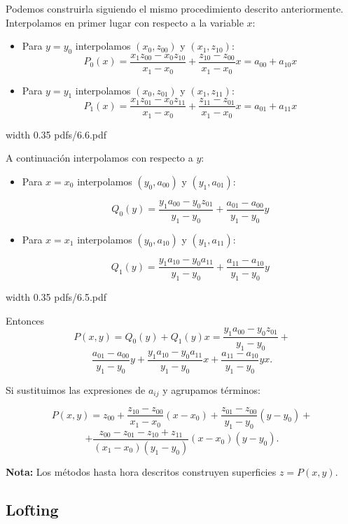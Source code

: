 \documentclass[twoside]{report}
\newcommand{\colocapdf}[2]{\quad\pdfimage width #2 {pdfs/#1.pdf}}
\begin{document}
Podemos construirla siguiendo el mismo procedimiento descrito anteriormente. Interpolamos en primer lugar con respecto a la variable $x$:
\begin{itemize}
\item Para $y=y_0$ interpolamos $(x_0,z_{00})$ y $(x_1,z_{10})$:
$$P_0(x)=\frac{x_1 z_{00}-x_0 z_{10}}{x_1-x_0}+\frac{z_{10}-z_{00}}{x_1-x_0}x=a_{00}+a_{10}x$$
\item Para $y=y_1$ interpolamos $(x_0,z_{01})$ y $(x_1,z_{11})$:
$$P_1(x)=\frac{x_1 z_{01}-x_0 z_{11}}{x_1-x_0}+\frac{z_{11}-z_{01}}{x_1-x_0}x=a_{01}+a_{11}x$$
\end{itemize}

\begin{center}
\colocapdf{6.6}{0.35\textwidth}
\end{center}

A continuaci\'{o}n interpolamos con respecto a $y$:
\begin{itemize}
\item Para $x=x_0$ interpolamos $(y_0,a_{00})$ y $(y_1,a_{01})$:

$$Q_0(y)=\frac{y_1 a_{00}-y_0 z_{01}}{y_1-y_0}+\frac{a_{01}-a_{00}}{y_1-y_0}y$$
\item Para $x=x_1$ interpolamos $(y_0,a_{10})$ y $(y_1,a_{11})$:

$$Q_1(y)=\frac{y_1 a_{10}-y_0 a_{11}}{y_1-y_0}+\frac{a_{11}-a_{10}}{y_1-y_0}y$$

\end{itemize}

\begin{center}
\colocapdf{6.5}{0.35\textwidth}
\end{center}

Entonces
$$P(x,y)=Q_0(y)+Q_1(y)x=\frac{y_1 a_{00}-y_0 z_{01}}{y_1-y_0}+$$
$$\frac{a_{01}-a_{00}}{y_1-y_0}y+\frac{y_1 a_{10}-y_0 a_{11}}{y_1-y_0}x+\frac{a_{11}-a_{10}}{y_1-y_0}yx.$$

Si sustituimos las expresiones de $a_{ij}$ y agrupamos t\'{e}rminos:

$$P(x,y)=z_{00}+\frac{z_{10}- z_{00}}{x_1-x_0}(x-x_0)+\frac{z_{01}-z_{00}}{y_1-y_0}(y-y_0)+$$
$$+\frac{z_{00}-z_{01}-z_{10}+z_{11}}{(x_1-x_0)(y_1-y_0)}(x-x_0)(y-y_0).$$

{\bf Nota:} Los m\'{e}todos hasta hora descritos construyen superficies $z=P(x,y).$

\subsection{Lofting}
\end{document}
